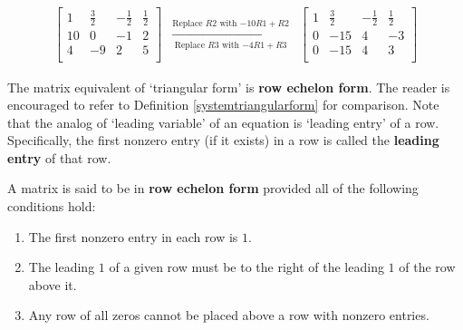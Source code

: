 \[\begin{array}{ccc}

\left[ \begin{array}{rrr|r} 
1 & \frac{3}{2} & -\frac{1}{2} & \frac{1}{2}  \\
10 & 0 & -1 & 2 \\ 
4 & -9 & 2 & 5 \\ 

\end{array} \right]

&
\xrightarrow[\text{Replace $R3$ with $-4R1 + R3$}]{\text{Replace $R2$ with $-10R1 + R2$}}
&

\left[ \begin{array}{rrr|r} 
1 & \frac{3}{2} & -\frac{1}{2} & \frac{1}{2}  \\
0 & -15 & 4 & -3 \\ 
0 & -15 & 4 & 3 \\ 

\end{array} \right]

\end{array}\]

The matrix equivalent of `triangular form' is   \textbf{row echelon form}.  The reader is encouraged to refer to Definition \ref{systemtriangularform} for comparison.  Note that the analog of `leading variable' of an equation is `leading entry' of a row.  Specifically, the first nonzero entry (if it exists) in a row is called the   \textbf{leading entry} of that row.
 
\smallskip

\colorbox{ResultColor}{\bbm  

\begin{defn} \label{rowechelonform} A matrix is said to be in \textbf{row echelon form} provided all of the following conditions hold:

\begin{enumerate}

\item  The first nonzero entry in each row is $1$.

\item  The leading $1$ of a given row must be to the right of the leading $1$ of the row above it.

\item  Any row of all zeros cannot be placed above a row with nonzero entries.

\end{enumerate}



\end{defn}

\ebm}

